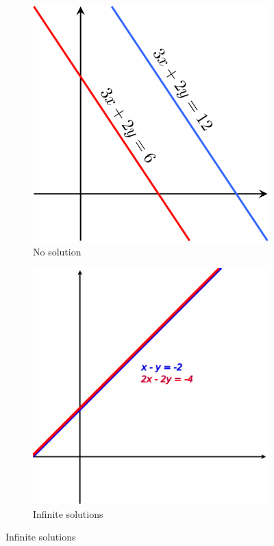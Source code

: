 \begin{figure}[h!]
\begin{subfigure}{0.3\textwidth}
		\includegraphics[width=\textwidth]{Linear_Algebra/no_solution}
		\caption{No solution}
		\end{subfigure}
		\hspace{1em}
		\begin{subfigure}{0.3\textwidth}
		\includegraphics[width=\textwidth]{Linear_Algebra/infinite_solutions}
		\caption{Infinite solutions}
		\end{subfigure}
	\end{figure}

